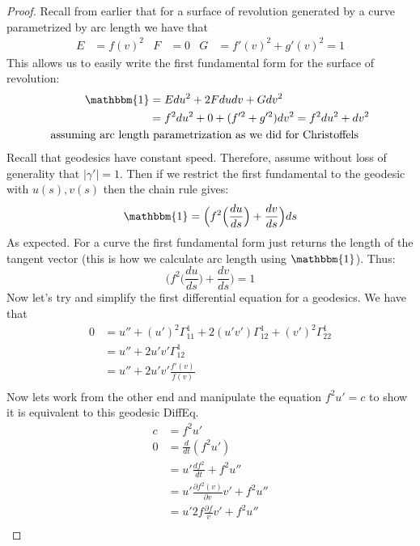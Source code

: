 \documentclass[a4paper, 11pt]{article}
\begin{document}
\begin{enumerate}[label=\alph*]
		\begin{proof}
			Recall from earlier that for a surface of revolution generated by a curve parametrized by arc length we have that
				\begin{align*}
					E&= f(v)^2 & F&= 0 & G&= f'(v)^2+g'(v)^2 = 1 
				\end{align*}
			This allows us to easily write the first fundamental form for the surface of revolution:
				\begin{align*}
					\mathbbm{1} &= Edu^2+2Fdudv+Gdv^2 \\ 
						&= f^2du^2+0+(f'^2+g'^2)dv^2 = f^2du^2+dv^2\\ 
						\text{assuming arc length} &\text{ parametrization as we did for Christoffels}
				\end{align*}
			Recall that geodesics have constant speed. Therefore, assume without loss of generality that $|\gamma '|=1$. Then if we restrict the first fundamental to the geodesic with $u(s), v(s)$ then the chain rule gives: 
				\begin{equation*}
					\mathbbm{1} = \Big(f^2\Big(\frac{du}{ds}\Big)+\frac{dv}{ds}\Big)ds
				\end{equation*} 
			As expected. For a curve the first fundamental form just returns the length of the tangent vector (this is how we calculate arc length using $\mathbbm{1}$). Thus:
				\begin{equation*}
					\Big(f^2\Big(\frac{du}{ds}\Big)+\frac{dv}{ds}\Big) = 1
				\end{equation*}
			Now let's try and simplify the first differential equation for a geodesics. We have that
				\begin{align*}
					0&= u''+(u')^2\Gamma_{11}^1+2(u'v')\Gamma_{12}^1+(v')^2\Gamma_{22}^1\\
						&=u''+2u'v'\Gamma_{12}^1  \\ 
						&=u''+2u'v'\frac{f'(v)}{f(v)} \\
				\end{align*}
			Now lets work from the other end and manipulate the equation $f^2u'=c$ to show it is equivalent to this geodesic DiffEq. 
				\begin{align*}
					c	&= f^2u' \\ 
					0	&= \frac{d}{dt}(f^2u')\\ 
						&= u'\frac{df^2}{dt}+f^2u'' \\ 
						&= u'\frac{\partial f^2(v)}{\partial v}v' + f^2u'' \\ 	
						&= u'2f\frac{\partial f}{v}v' + f^2u'' \\ 

\end{align*}
\end{proof}
\end{enumerate}
\end{document}
